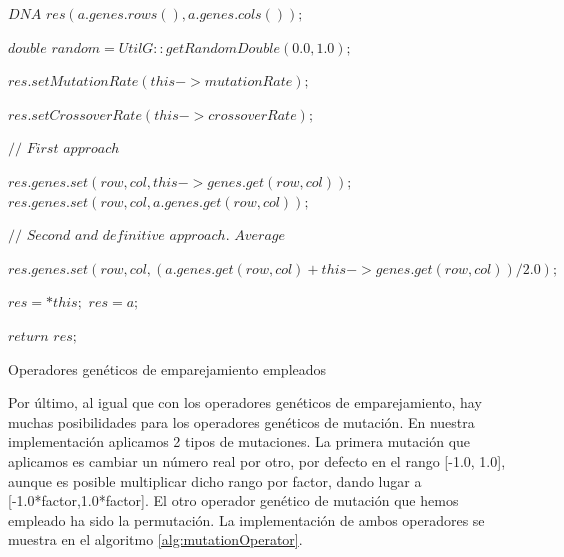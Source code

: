 \begin{algorithm}[H]
    $DNA$ $res(a.genes.rows(), a.genes.cols());$

    $double$ $random = UtilG::getRandomDouble(0.0, 1.0);$

    {
        $res.setMutationRate(this->mutationRate);$
        
        $res.setCrossoverRate(this->crossoverRate);$

        {
            {
                {
                    $//$ $First$ $approach$
                    
                    {
                        $res.genes.set(row, col, this->genes.get(row, col));$
                    }
                    {
                        $res.genes.set(row, col, a.genes.get(row, col));$
                    }

                    $//$ $Second$ $and$ $definitive$ $approach.$ $Average$
                    
                    $res.genes.set(row, col, (a.genes.get(row, col) + this->genes.get(row, col)) / 2.0);$
                }
            }
        }
    }
    {
        {
            $res = *this;$
        }
        {
            $res = a;$
        }
    }

    $return$ $res;$
    
	\caption{Operadores genéticos de emparejamiento empleados}
	\label{alg:crossoverOperator}
\end{algorithm}

Por último, al igual que con los operadores genéticos de emparejamiento, hay muchas posibilidades para los operadores genéticos de mutación. En nuestra implementación aplicamos 2 tipos de mutaciones. La primera mutación que aplicamos es cambiar un número real por otro, por defecto en el rango [-1.0, 1.0], aunque es posible multiplicar dicho rango por factor, dando lugar a [-1.0*factor,1.0*factor]. El otro operador genético de mutación que hemos empleado ha sido la permutación. La implementación de ambos operadores se muestra en el algoritmo \ref{alg:mutationOperator}.

